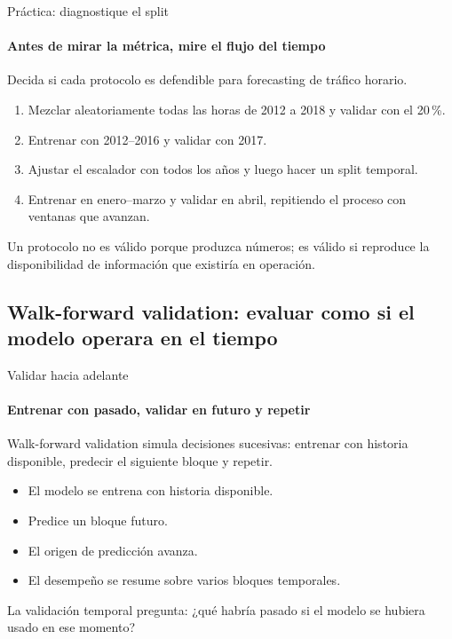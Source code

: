 \documentclass[aspectratio=169,11pt]{beamer}  %
\newcommand{\Lg}{\fontsize{16}{20}\selectfont}
\newcommand{\bigstate}[1]{\begin{center}\Lg #1\end{center}}
\begin{document}
\begin{frame}{Práctica: diagnostique el split}
\framesubtitle{Antes de mirar la métrica, mire el flujo del tiempo}
\begin{taskbox}
Decida si cada protocolo es defendible para forecasting de tráfico horario.
\end{taskbox}
\begin{enumerate}
\item Mezclar aleatoriamente todas las horas de 2012 a 2018 y validar con el 20\,\%.
\item Entrenar con 2012--2016 y validar con 2017.
\item Ajustar el escalador con todos los años y luego hacer un split temporal.
\item Entrenar en enero--marzo y validar en abril, repitiendo el proceso con ventanas que avanzan.
\end{enumerate}
\begin{goldbox}
Un protocolo no es válido porque produzca números; es válido si reproduce la disponibilidad de información que existiría en operación.
\end{goldbox}
\end{frame}

\subsection{Walk-forward validation: evaluar como si el modelo operara en el tiempo}

\begin{frame}{Validar hacia adelante}
\framesubtitle{Entrenar con pasado, validar en futuro y repetir}
\bigstate{Walk-forward validation simula decisiones sucesivas: entrenar con historia disponible, predecir el siguiente bloque y repetir.}
\begin{itemize}\small
\item El modelo se entrena con historia disponible.
\item Predice un bloque futuro.
\item El origen de predicción avanza.
\item El desempeño se resume sobre varios bloques temporales.
\end{itemize}
\bigstate{La validación temporal pregunta: ¿qué habría pasado si el modelo se hubiera usado en ese momento?}
\end{frame}
\end{document}
